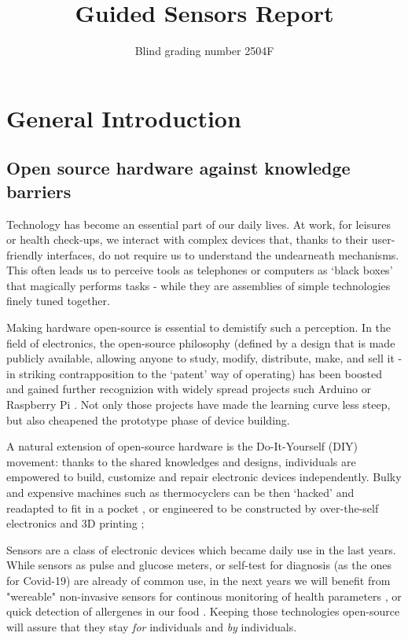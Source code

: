 \documentclass[conference]{IEEEtran}
\begin{document}
\title{Guided Sensors Report}
\author{Blind grading number 2504F}
\maketitle

\section{General Introduction} %
\subsection{Open source hardware against knowledge barriers}
Technology has become an essential part of our daily lives. 
At work, for leisures or health check-ups, we interact with complex devices that, 
thanks to their user-friendly interfaces, do not require us to understand the 
undearneath mechanisms. This often leads us to perceive tools as telephones or 
computers as `black boxes' that magically performs tasks - while they are 
assemblies of simple technologies finely tuned together.

Making hardware open-source is essential to demistify such a perception. In the 
field of electronics, the open-source philosophy (defined by a design that is made 
publicly available, allowing anyone to study, modify, distribute, make, and sell 
it \cite{dosemagenGatheringOpenScience2017} - in striking contrapposition to the 
`patent' way of operating) has been boosted and gained further recognizion with 
widely spread projects such Arduino \cite{ArduinoHome} or Raspberry Pi 
\cite{foundationTeachLearnMake2023}. Not only those projects have made the 
learning curve less steep, but also cheapened the prototype phase of device building.

A natural extension of open-source hardware is the Do-It-Yourself (DIY) movement: 
thanks to the shared knowledges and designs, individuals are empowered to build, 
customize and repair electronic devices independently. Bulky and expensive machines 
such as thermocyclers can be then `hacked' and readapted to fit in a pocket 
\cite{PocketPCRGaudiShop}, or engineered to be constructed by over-the-self 
electronics and 3D printing \cite{AirFlowMicroreactor}; 

Sensors are a class of electronic devices which became daily use in the 
last years. While sensors as pulse and glucose meters, or self-test for 
diagnosis (as the ones for Covid-19) are already of common use, in the next years 
we will benefit from "wereable" non-invasive sensors for continous monitoring of 
health parameters \cite{smithReshapingHealthcareWearable2023}, or quick detection of 
allergenes in our food \cite{sundhoroRapidAccurateElectrochemical2021}. Keeping 
those technologies open-source will assure that they stay \textit{for} individuals and \textit{by}
individuals.
\end{document}
